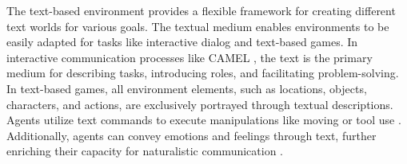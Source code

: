 The text-based environment provides a flexible framework for creating different text worlds for various goals. The textual medium enables environments to be easily adapted for tasks like interactive dialog and text-based games. In interactive communication processes like CAMEL \cite{DBLP:journals/corr/abs-2303-17760}, the text is the primary medium for describing tasks, introducing roles, and facilitating problem-solving. In text-based games, all environment elements, such as locations, objects, characters, and actions, are exclusively portrayed through textual descriptions. Agents utilize text commands to execute manipulations like moving or tool use \cite{DBLP:journals/corr/abs-2012-02757,DBLP:conf/ijcai/CoteKYKBFMHAATT18, DBLP:conf/aaai/HausknechtACY20,  DBLP:journals/corr/abs-2308-01404}. Additionally, agents can convey emotions and feelings through text, further enriching their capacity for naturalistic communication \cite{DBLP:conf/emnlp/UrbanekFKJHDRKS19}.

